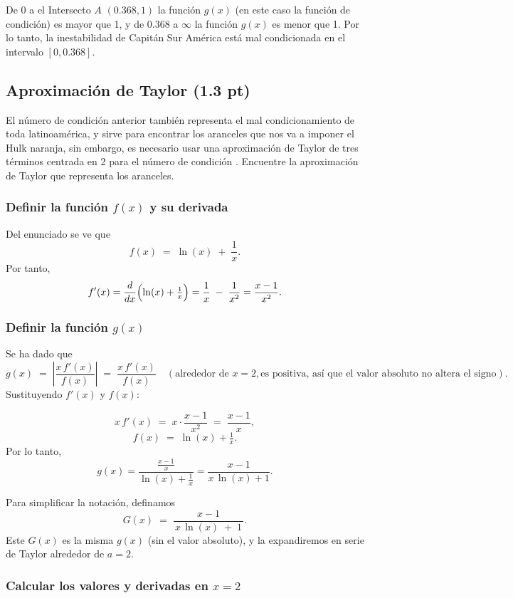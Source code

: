 De $0$ a el Intersecto $A$ $(0.368, 1)$ la función $g(x)$ (en este caso la función de condición)
es mayor que 1, y de $0.368$ a $\infty$ la función $g(x)$ es menor que 1. Por lo tanto,
la inestabilidad de Capitán Sur América está mal condicionada en el intervalo $[0, 0.368]$.

\subsection{Aproximación de Taylor (1.3 pt)}
El número de condición anterior también representa el mal condicionamiento de toda latinoamérica, y sirve para encontrar los aranceles que nos va a imponer el Hulk naranja, sin embargo, es necesario usar una aproximación de Taylor  de tres términos centrada en 2 para el número de condición . Encuentre la aproximación de Taylor que representa los aranceles.


\subsubsection{Definir la función \(f(x)\) y su derivada}

Del enunciado se ve que
\[
f(x) \;=\; \ln(x) \;+\;\frac{1}{x}.
\]
Por tanto,
\[
f'(x) 
=\frac{d}{dx}\Bigl(\ln(x)+\tfrac{1}{x}\Bigr)
=\frac{1}{x}\;-\;\frac{1}{x^2}
=\frac{x-1}{x^2}.
\]

\subsubsection{Definir la función \(g(x)\)}

Se ha dado que
\[
g(x) 
\;=\;\left|\frac{x\,f'(x)}{f(x)}\right|
\;=\;\frac{x\,f'(x)}{f(x)}
\quad(\text{alrededor de }x=2, \text{es positiva, así que el valor absoluto no altera el signo}).
\]
Sustituyendo \(f'(x)\) y \(f(x)\):

\[
x\,f'(x) \;=\; x \cdot \frac{x-1}{x^2}
\;=\;\frac{x-1}{x},
\]
\[
f(x) \;=\;\ln(x)+\tfrac{1}{x}.
\]
Por lo tanto,
\[
g(x) 
=\frac{\frac{x-1}{x}}{\ln(x) + \tfrac{1}{x}}
=\frac{x-1}{x\,\ln(x) + 1}.
\]

Para simplificar la notación, definamos
\[
G(x)\;=\;\frac{x-1}{\,x\,\ln(x)\;+\;1\,}.
\]
Este \(G(x)\) es la misma \(g(x)\) (sin el valor absoluto), y la expandiremos en serie de Taylor alrededor de \(a=2\).


\subsubsection{Calcular los valores y derivadas en \(x=2\)}

